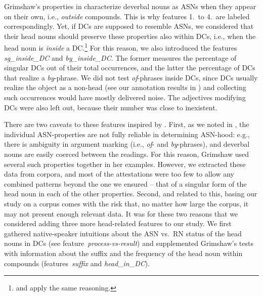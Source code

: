 \documentclass[output=paper]{langsci/langscibook}
\begin{document}
Grimshaw's properties in  characterize deverbal nouns as ASNs when they appear on their own, i.e., \textit{outside} compounds. This is why features 1.~to 4.~are labeled correspondingly. Yet, if DCs are supposed to resemble ASNs, we considered that their head nouns should preserve these properties also within DCs, i.e., when the head noun is \textit{inside} a DC.\footnote{\cite{disciullo:92} and \cite{borer:13}  apply the same reasoning.} For this reason, we also introduced the features \textit{sg\_inside\_DC} and \textit{by\_inside\_DC}. The former measures the percentage of singular DCs out of their total occurrences, and the latter the percentage of DCs that realize a \textit{by}-phrase. We did not test \textit{of}-phrases inside DCs, since DCs usually realize the object as a non-head (see our annotation results in ) and collecting such occurrences would have mostly delivered noise. The adjectives modifying DCs were also left out, because their number was close to inexistent.

There are two caveats to these features inspired by \cite{grimshaw:90}. First, as we noted in , the individual ASN-properties are not fully reliable in determining ASN-hood: e.g., there is ambiguity in argument marking (i.e., \textit{of}- and \textit{by}-phrases), and  deverbal nouns are easily coerced between the readings. For this reason, Grimshaw used several such properties together in her examples. However, we extracted these data from corpora, and most of the attestations were too few to allow any combined patterns beyond the one we ensured -- that of a singular form of the head noun in each of the other properties. Second, and related to this, basing our study on a corpus comes with the risk that, no matter how large the corpus, it may not present enough relevant data. It was for these two reasons that we considered adding three more head-related features to our study. We first gathered native-speaker intuitions about the ASN vs.~RN status of the head nouns in DCs (see  feature~\textit{process-vs-result}) and supplemented Grimshaw's tests with information about the suffix  and the frequency of  the head noun within compounds (features~\textit{suffix} and \textit{head\_in\_DC}).\largerpage[2]
\end{document}
